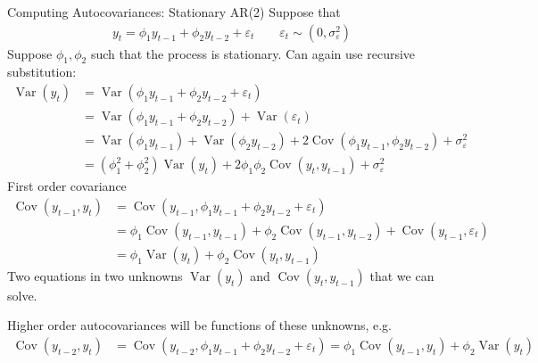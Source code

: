 \documentclass[aspectratio=169, handout]{beamer}
\newcommand{\Cov}{\operatorname{Cov}}
\newcommand{\Var}{\operatorname{Var}}
\begin{document}
{\scriptsize
\begin{frame}{Computing Autocovariances: Stationary AR(2)}
Suppose that
\begin{align*}
  y_t = \phi_1 y_{t-1} + \phi_2 y_{t-2} + \varepsilon_t
  \qquad
  \varepsilon_t\sim (0,\sigma^2_\varepsilon)
\end{align*}
Suppose $\phi_1,\phi_2$ such that the process is stationary.
Can again use recursive substitution:
\begin{align*}
  \Var(y_t)
  &= \Var(\phi_1 y_{t-1} + \phi_2 y_{t-2} + \varepsilon_t)
  \\
  &=
  \Var(\phi_1 y_{t-1} + \phi_2 y_{t-2}) + \Var(\varepsilon_t)
  \\
  &=
  \Var(\phi_1 y_{t-1})
  +
  \Var(\phi_2 y_{t-2})
  +
  2\Cov(\phi_1 y_{t-1}, \phi_2 y_{t-2})
  + \sigma^2_\varepsilon
  \\
  &=
  (\phi_1^2 + \phi_2^2) \Var(y_{t})
  + 2\phi_1\phi_2  \Cov(y_{t}, y_{t-1})
  + \sigma^2_\varepsilon
\end{align*}
\pause
First order covariance
\begin{align*}
  \Cov(y_{t-1},y_t)
  &=
  \Cov(y_{t-1},\phi_1 y_{t-1} + \phi_2 y_{t-2} + \varepsilon_t)
  \\
  &=
  \phi_1 \Cov(y_{t-1},y_{t-1})
  +
  \phi_2 \Cov(y_{t-1},y_{t-2})
  +
  \Cov(y_{t-1},\varepsilon_t)
  \\
  &=
  \phi_1 \Var(y_{t})
  +
  \phi_2 \Cov(y_{t},y_{t-1})
\end{align*}
\pause
\alert{Two equations in two unknowns} $\Var(y_t)$ and
$\Cov(y_t,y_{t-1})$ that we can solve.

\alert{Higher order autocovariances} will be functions of these
unknowns, e.g.
\begin{align*}
  \Cov(y_{t-2},y_t)
  &=
  \Cov(y_{t-2},\phi_1 y_{t-1} + \phi_2 y_{t-2} + \varepsilon_t)
  =
  \phi_1 \Cov(y_{t-1},y_{t})
  +
  \phi_2 \Var(y_{t})
\end{align*}
\end{frame}
}
\end{document}
